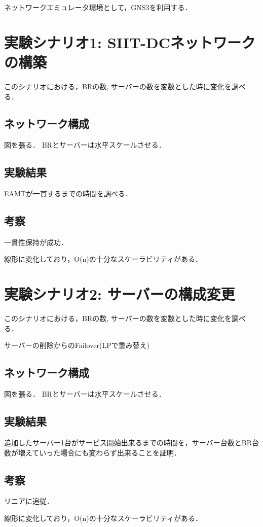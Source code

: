 ネットワークエミュレータ環境として，GNS3を利用する．



\section{実験シナリオ1: SIIT-DCネットワークの構築}
このシナリオにおける，BRの数, サーバーの数を変数とした時に変化を調べる．

\subsection{ネットワーク構成}
図を張る． BRとサーバーは水平スケールさせる．


\subsection{実験結果}
EAMTが一貫するまでの時間を調べる．

\subsection{考察}
一貫性保持が成功．

線形に変化しており，O(n)の十分なスケーラビリティがある．


\section{実験シナリオ2: サーバーの構成変更}
このシナリオにおける，BRの数, サーバーの数を変数とした時に変化を調べる．

サーバーの削除からのFailover(LPで重み替え)



\subsection{ネットワーク構成}
図を張る． BRとサーバーは水平スケールさせる．

\subsection{実験結果}
追加したサーバー1台がサービス開始出来るまでの時間を，サーバー台数とBR台数が増えていった場合にも変わらず出来ることを証明．


\subsection{考察}
リニアに追従．

線形に変化しており，O(n)の十分なスケーラビリティがある．



